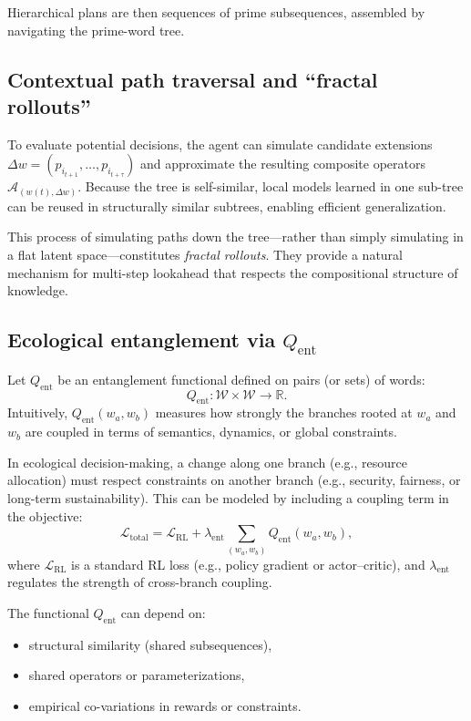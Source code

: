 \documentclass[11pt]{article}
\newcommand{\R}{\mathbb{R}}
\newcommand{\Acal}{\mathcal{A}}
\newcommand{\Lcal}{\mathcal{L}}
\begin{document}
Hierarchical plans are then sequences of prime subsequences, assembled by navigating the prime-word tree.

\subsection{Contextual path traversal and ``fractal rollouts''}

To evaluate potential decisions, the agent can simulate candidate extensions \(\Delta w = (p_{i_{t+1}}, \dots, p_{i_{t+\tau}})\) and approximate the resulting composite operators \(\Acal_{(w(t), \Delta w)}\).
Because the tree is self-similar, local models learned in one sub-tree can be reused in structurally similar subtrees, enabling efficient generalization.

This process of simulating paths down the tree---rather than simply simulating in a flat latent space---constitutes \emph{fractal rollouts}.
They provide a natural mechanism for multi-step lookahead that respects the compositional structure of knowledge.

\subsection{Ecological entanglement via \texorpdfstring{\(Q_{\mathrm{ent}}\)}{Q\_ent}}

Let \(Q_{\mathrm{ent}}\) be an entanglement functional defined on pairs (or sets) of words:
\[
Q_{\mathrm{ent}} : \mathscr{W} \times \mathscr{W} \to \R.
\]
Intuitively, \(Q_{\mathrm{ent}}(w_a, w_b)\) measures how strongly the branches rooted at \(w_a\) and \(w_b\) are coupled in terms of semantics, dynamics, or global constraints.

In ecological decision-making, a change along one branch (e.g., resource allocation) must respect constraints on another branch (e.g., security, fairness, or long-term sustainability).
This can be modeled by including a coupling term in the objective:
\[
\Lcal_{\mathrm{total}} = \Lcal_{\mathrm{RL}} + \lambda_{\mathrm{ent}} \sum_{(w_a,w_b)} Q_{\mathrm{ent}}(w_a, w_b),
\]
where \(\Lcal_{\mathrm{RL}}\) is a standard RL loss (e.g., policy gradient or actor--critic), and \(\lambda_{\mathrm{ent}}\) regulates the strength of cross-branch coupling.

The functional \(Q_{\mathrm{ent}}\) can depend on:
\begin{itemize}[nosep]
    \item structural similarity (shared subsequences),
    \item shared operators or parameterizations,
    \item empirical co-variations in rewards or constraints.
\end{itemize}
\end{document}
